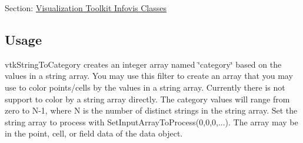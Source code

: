 Section\-: \hyperlink{sec_vtkinfovis}{Visualization Toolkit Infovis Classes} \hypertarget{vtkwidgets_vtkxyplotwidget_Usage}{}\subsection{Usage}\label{vtkwidgets_vtkxyplotwidget_Usage}
vtk\-String\-To\-Category creates an integer array named \char`\"{}category\char`\"{} based on the values in a string array. You may use this filter to create an array that you may use to color points/cells by the values in a string array. Currently there is not support to color by a string array directly. The category values will range from zero to N-\/1, where N is the number of distinct strings in the string array. Set the string array to process with Set\-Input\-Array\-To\-Process(0,0,0,...). The array may be in the point, cell, or field data of the data object.

